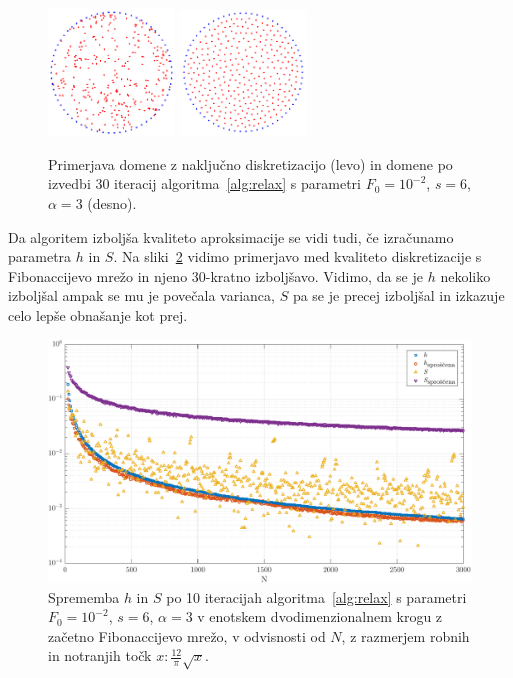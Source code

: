 \documentclass[12pt,a4paper,twoside]{article}
\theoremstyle{definition} %
\theoremstyle{plain} %
\numberwithin{equation}{section}
\newlength{\iw}
\begin{document}
\begin{figure}[!ht]
  \centering
  \includegraphics[width=0.3\textwidth]{images/domain_circle.png}
  \hspace{1em}
  \includegraphics[width=0.3\textwidth]{images/domain_circle_relaxed.png}
  \caption[Primerjava naključno diskretizirane in izboljšane domene.]{Primerjava
  domene z naključno diskretizacijo (levo) in domene po izvedbi 30 iteracij
algoritma~\ref{alg:relax} s parametri $F_0 = 10^{-2}$, $s = 6$, $\alpha = 3$
(desno).}
  \label{fig:relax-circle}
\end{figure}

Da algoritem izboljša kvaliteto aproksimacije se vidi tudi, če izračunamo
parametra $h$ in $S$. Na sliki~\ref{fig:relax-hs} vidimo primerjavo med
kvaliteto diskretizacije s Fibonaccijevo mrežo in njeno 30-kratno izboljšavo.
Vidimo, da se je $h$ nekoliko izboljšal ampak se mu je povečala varianca,
$S$ pa se je precej izboljšal in izkazuje celo lepše obnašanje kot prej.

\begin{figure}[ht]
  \centering
  \includegraphics[width=\iw]{images/relax_improvement.pdf}
  \caption[Sprememba kvalitete diskretizacije po izboljšavi.]{Sprememba $h$ in
    $S$ po 10 iteracijah algoritma~\ref{alg:relax} s parametri $F_0 = 10^{-2}$,
    $s = 6$, $\alpha = 3$ v enotskem dvodimenzionalnem krogu z začetno
    Fibonaccijevo mrežo, v odvisnosti od $N$, z razmerjem robnih in notranjih
  točk $x : \frac{12}{\pi} \sqrt{x}$.}
  \label{fig:relax-hs}
\end{figure}
\end{document}
